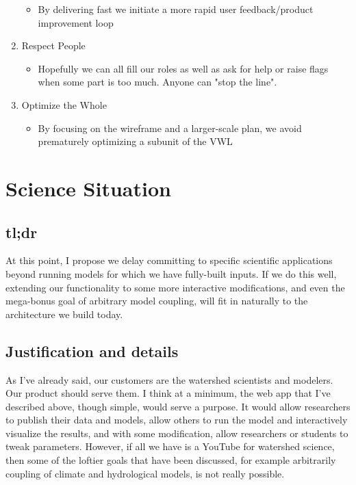 \documentclass[
11pt, %
a4paper, %
oneside, %
twoside, %
headinclude,footinclude, %
BCOR5mm, %
]{scrartcl}
\begin{document}
\begin{enumerate}
\begin{itemize}
            \item By delivering fast we initiate a more rapid user feedback/product improvement loop
        \end{itemize}
    \item Respect People
        \begin{itemize}
            \item Hopefully we can all fill our roles as well as ask for help or raise flags when
                some part is too much. Anyone can "stop the line".
        \end{itemize}
    \item Optimize the Whole
        \begin{itemize}
            \item By focusing on the wireframe and a larger-scale plan, we avoid prematurely
                optimizing a subunit of the VWL
        \end{itemize}
\end{enumerate}

\section{Science Situation} %
\label{sec:science}

\subsection{tl;dr} %
\label{sub:tl;dr}

At this point, I propose we delay committing to specific scientific applications beyond
running models for which we have fully-built inputs. If we do this well, extending our
functionality to some more interactive modifications, and even the mega-bonus goal of
arbitrary model coupling, will fit in naturally to the architecture we build today.



\subsection{Justification and details} %
\label{sub:Justification and details}


As I've already said, our customers are the watershed scientists and modelers. Our product
should serve them. I think at a minimum, the web app that I've described above, though 
simple, would serve a purpose. It would allow researchers to publish their data and models,
allow others to run the model and interactively visualize the results, and with some 
modification, allow researchers or students to tweak parameters. However, if all we have
is a YouTube for watershed science, then some of the loftier goals that have been discussed,
for example arbitrarily coupling of climate and hydrological models, is not really possible.
\end{document}
